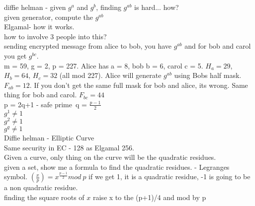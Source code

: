 \documentclass[12pt]{amsart}
\begin{document}
diffie helman - given $g^a$ and $g^b$, finding $g^{ab}$ is hard... how?\\
	given generator, compute the $g^{ab}$\\
	Elgamal- how it works.\\
	how to involve 3 people into this?\\
	sending encrypted message from alice to bob, you have $g^{ab}$ and for bob and carol you get $g^{bc}$.\\
	m = 59, g = 2, p = 227.  Alice has a = 8, bob b = 6, carol c = 5.  $H_a = 29$, $H_b = 64$, $H_c = 32$ (all mod 227).  Alice will generate $g^{ab}$ using Bobs half mask. $F_{ab} = 12$.  If you don't get the same full mask for bob and alice, its wrong.  Same thing for bob and carol.  $F_{bc} = 44$\\
	p = 2q+1 - safe prime\
	q = $\frac{p-1}{2}$\\
	$g^1 \neq 1$\\
	$g^2 \neq 1$\\
	$g^q \neq 1$\\
	
Diffie helman - Elliptic Curve\\
	Same security in EC - 128 as Elgamal 256.\\
	Given a curve, only thing on the curve will be the quadratic residues.\\
	given a set, show me a formula to find the quadratic residues. - Legranges symbol. $(\frac{x}{p}) = x ^{\frac{p-1}{2}} mod\ p$ if we get 1, it is a quadratic residue, -1 is going to be a non quadratic residue.\\
	finding the square roots of $x$ raise x to the (p+1)/4 and mod by p\\
\end{document}
